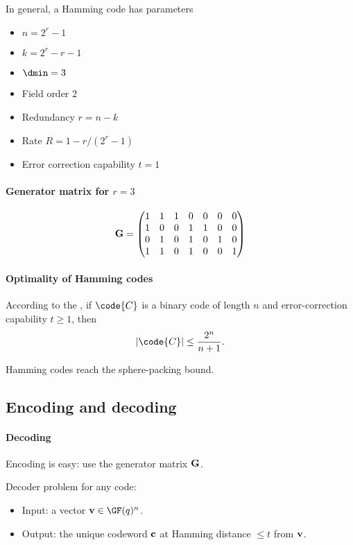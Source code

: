 \documentclass[a4paper, 11pt, openany]{book}
\begin{document}
In general, a Hamming code has parameters
\begin{itemize}
	\item {} $n= 2^r - 1$
	\item {} $k = 2^r-r-1$
	\item {} $\dmin = 3$
	\item Field order $2$
	\item Redundancy $r = n-k$
	\item Rate $R = 1 - r/(2^r-1)$
	\item Error correction capability $t=1$
\end{itemize}

\paragraph{Generator matrix for $r=3$}
\[
	{\bf G} = \begin{pmatrix}
	1 & 1 & 1 & 0 & 0 & 0 & 0\\
	1 & 0 & 0 & 1 & 1 & 0 & 0\\
	0 & 1 & 0 & 1 & 0 & 1 & 0\\
	1 & 1 & 0 & 1 & 0 & 0 & 1\\
	\end{pmatrix}
\]



\paragraph{Optimality of Hamming codes}
According to the , if $\code{C}$ is a binary code of length $n$ and error-correction capability $t \ge 1$, then
\[
	|\code{C}| \le \frac{2^n}{n+1}.
\]

\begin{theorem}
Hamming codes reach the sphere-packing bound.
\end{theorem}



\subsection{Encoding and decoding}


\paragraph{Decoding}
Encoding is easy: use the generator matrix ${\bf G}$.

Decoder problem for any code:
\begin{itemize}
	\item Input: a vector ${\bf v} \in \GF(q)^n$.

	\item Output: the unique codeword ${\bf c}$ at Hamming distance $\le t$ from ${\bf v}$.
\end{itemize}
\end{document}
